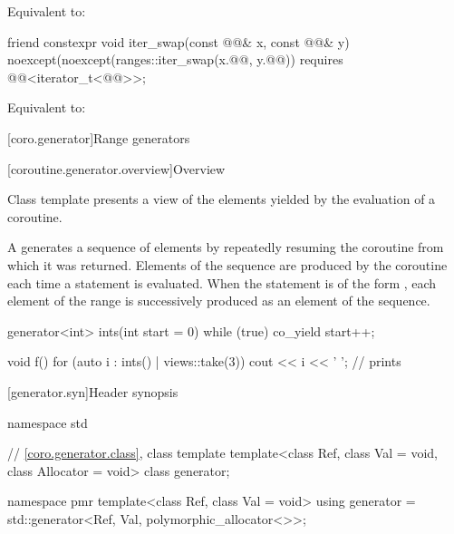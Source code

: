 \begin{itemdescr}
\pnum
\effects
Equivalent to: 
\end{itemdescr}

%
\begin{itemdecl}
friend constexpr void iter_swap(const @@& x, const @@& y)
  noexcept(noexcept(ranges::iter_swap(x.@@, y.@@))
  requires @@<iterator_t<@@>>;
\end{itemdecl}

\begin{itemdescr}
\pnum
\effects
Equivalent to: 
\end{itemdescr}

[coro.generator]{Range generators}

[coroutine.generator.overview]{Overview}

\pnum
Class template  presents
a view of the elements yielded by the evaluation of a coroutine.

\pnum
A  generates a sequence of elements by
repeatedly resuming the coroutine from which it was returned.
Elements of the sequence are produced by the coroutine
each time a  statement is evaluated.
When the  statement is of the form
,
each element of the range 
is successively produced as an element of the sequence.
\begin{example}
\begin{codeblock}
generator<int> ints(int start = 0) {
  while (true)
    co_yield start++;
}

void f() {
  for (auto i : ints() | views::take(3))
    cout << i << ' ';       // prints 
}
\end{codeblock}
\end{example}

[generator.syn]{Header  synopsis}

%
\begin{codeblock}
namespace std {
  // \ref{coro.generator.class}, class template 
  template<class Ref, class Val = void, class Allocator = void>
    class generator;

  namespace pmr {
    template<class Ref, class Val = void>
      using generator = std::generator<Ref, Val, polymorphic_allocator<>>;
  }
}
\end{codeblock}

